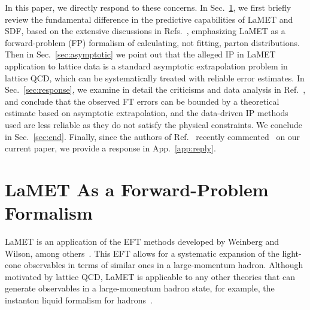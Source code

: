 \documentclass[prd,twocolumn,superscriptaddress,preprintnumbers,showpacs,nofootinbib,notitlepage,floatfix]{revtex4-2}
\DeclareRobustCommand{\app}[1]{App.~\ref{app:#1}}
\DeclareRobustCommand{\sec}[1]{Sec.~\ref{sec:#1}}
\begin{document}
In this paper, we directly respond to these concerns. In \sec{theory}, we first briefly review the fundamental difference in the predictive capabilities of LaMET and SDF, based on the extensive discussions in Refs.~\cite{Ji:2020brr,Ji:2020ect,Ji:2020byp,Ji:2022ezo,Ji:2024oka}, emphasizing LaMET as a forward-problem (FP) formalism of calculating, not fitting, parton distributions. Then in \sec{asymptotic} we point out that the alleged IP in LaMET application to lattice data is a standard asymptotic extrapolation problem in lattice QCD, which can be systematically treated with reliable error estimates. In \sec{response}, we examine in detail the criticisms and data analysis in Ref.~\cite{Dutrieux:2025jed}, and conclude that the observed FT errors can be bounded by a theoretical estimate based on asymptotic extrapolation, and the data-driven IP methods used are less reliable as they do not satisfy the physical constraints. We conclude in \sec{end}. Finally, since the authors of Ref.~\cite{Dutrieux:2025jed} recently commented~\cite{Dutrieux:2025axb} on our current paper, we provide a response in \app{reply}.

\section{LaMET As a Forward-Problem Formalism}
\label{sec:theory}

LaMET is an application of the EFT methods developed by Weinberg and Wilson, among others~\cite{Ji:2024oka}.
This EFT allows for a systematic expansion of the light-cone observables in terms of similar ones in a large-momentum hadron. Although motivated by lattice QCD, LaMET is applicable to any other theories that can generate
observables in a large-momentum hadron state, for example, the instanton liquid formalism for hadrons~\cite{Nowak:1996aj,Schafer:1996wv}.
\end{document}
